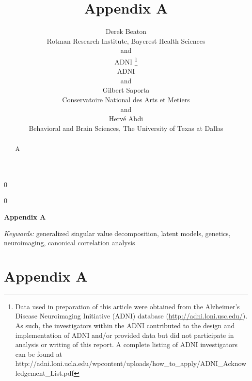 \documentclass[12pt]{article}
\newcommand{\blind}{0}
\begin{document}
\def\spacingset#1{\renewcommand{\baselinestretch}%
{#1}\small\normalsize} \spacingset{1}



\blind
{
  \title{\bf Appendix A}

  \author{
        Derek Beaton \\
    Rotman Research Institute, Baycrest Health Sciences\\
     and \\     ADNI \thanks{Data used in preparation of this article were obtained from the
Alzheimer's Disease Neuroimaging Initiative (ADNI) database
(\url{http://adni.loni.usc.edu/}). As such, the investigators within the
ADNI contributed to the design and implementation of ADNI and/or
provided data but did not participate in analysis or writing of this
report. A complete listing of ADNI investigators can be found at
http://adni.loni.ucla.edu/wpcontent/uploads/how\_to\_apply/ADNI\_Acknowledgement\_List.pdf} \\
    ADNI\\
     and \\     Gilbert Saporta \\
    Conservatoire National des Arts et Metiers\\
     and \\     Hervé Abdi \\
    Behavioral and Brain Sciences, The University of Texas at Dallas\\
      }
  \maketitle
} \fi

\blind
{
  \bigskip
  \bigskip
  \bigskip
  \begin{center}
    {\LARGE\bf Appendix A}
  \end{center}
  \medskip
} \fi

\bigskip
\begin{abstract}
A
\end{abstract}

\noindent%
{\it Keywords:} generalized singular value decomposition, latent models, genetics, neuroimaging, canonical correlation analysis
\vfill

\newpage
\spacingset{1.45} %

\hypertarget{appendix-a}{%
\section{Appendix A}\label{appendix-a}}
\end{document}
